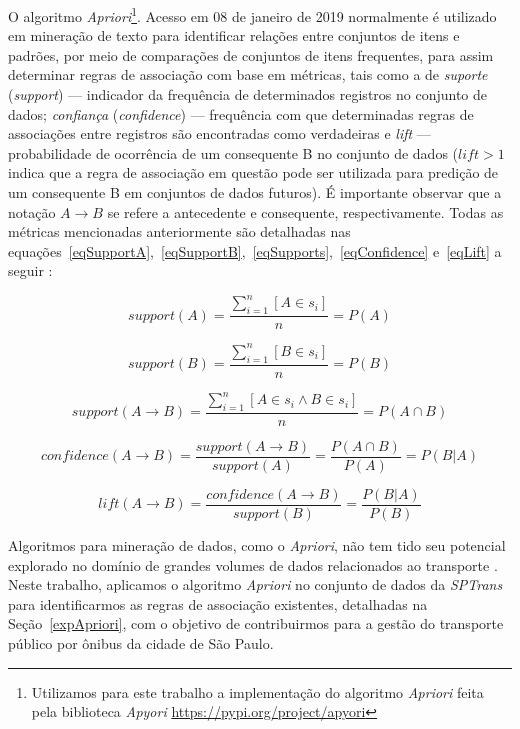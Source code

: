\documentclass[
	12pt,				%
	oneside,			%
	a4paper,			%
	english,			%
	brazil				%
	]{abntex2ppgsi}
\begin{document}
{{{O algoritmo \textit{Apriori}\footnote{Utilizamos para este trabalho a implementação do algoritmo \textit{Apriori} feita pela biblioteca \textit{Apyori}  \url{https://pypi.org/project/apyori}}. Acesso em 08 de janeiro de 2019} normalmente é utilizado em mineração de texto para identificar relações entre conjuntos de itens e padrões, por meio de comparações de conjuntos de itens frequentes, para assim determinar regras de associação com base em métricas, tais como a de \textit{suporte} (\textit{support}) --- indicador da frequência de determinados registros no conjunto de dados; \textit{confiança} (\textit{confidence}) --- frequência com que determinadas regras de associações entre registros são encontradas como verdadeiras e \textit{lift} --- probabilidade de ocorrência de um consequente B no conjunto de dados ($lift > 1$ indica que a regra de associação em questão pode ser utilizada para predição de um consequente B em conjuntos de dados futuros). É importante observar que a notação $A \rightarrow B$ se refere a antecedente e consequente, respectivamente. Todas as métricas mencionadas anteriormente são detalhadas nas equações~\ref{eqSupportA},~\ref{eqSupportB},~\ref{eqSupports},~\ref{eqConfidence} e~\ref{eqLift} a seguir  \cite{park2018apriori}:

\begin{equation}
\label{eqSupportA}
support(A) = \dfrac{\sum_{i=1}^{n}[A \in s_i]} {n} = P(A) 
\end{equation}

\begin{equation}
\label{eqSupportB}
support(B) = \dfrac{\sum_{i=1}^{n}[B \in s_i]} {n} = P(B) 
\end{equation}

\begin{equation}
\label{eqSupports}
support(A \rightarrow B) = \dfrac{\sum_{i=1}^{n}[A \in s_i \land B \in s_i]} {n} = P(A \cap B)
\end{equation}

\begin{equation}
\label{eqConfidence}
confidence(A \rightarrow B) = \dfrac{support(A \rightarrow B)}{support(A)} = \dfrac{P(A \cap B)}{P(A)} = P(B|A)
\end{equation}

\begin{equation}
\label{eqLift}
lift(A \rightarrow B) = \dfrac{confidence(A \rightarrow B)}{support(B)} = \dfrac{P(B|A)}{P(B)}
\end{equation}

Algoritmos para mineração de dados, como o \textit{Apriori}, não tem tido seu potencial explorado no domínio de grandes volumes de dados relacionados ao transporte \cite{park2018apriori}. Neste trabalho, aplicamos o algoritmo \textit{Apriori} no conjunto de dados da \textit{SPTrans} para identificarmos as regras de associação existentes, detalhadas na Seção~\ref{expApriori}, com o objetivo de contribuirmos para a gestão do transporte público por ônibus da cidade de São Paulo.   

}}
\end{document}
